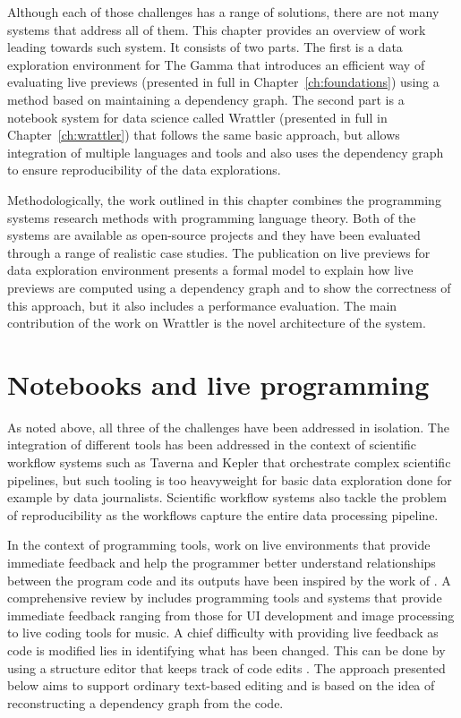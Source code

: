 \documentclass[fleqn,11pt]{report}
\theoremstyle{definition}
\begin{document}
Although each of those challenges has a range of solutions, there are not many systems that
address all of them. This chapter provides an overview of work leading towards such system.
It consists of two parts. The first is a data exploration environment for The Gamma that introduces
an efficient way of evaluating live previews (presented in full in Chapter~\ref{ch:foundations})
using a method based on maintaining a dependency graph. The second part is a notebook system for
data science called Wrattler (presented in full in Chapter~\ref{ch:wrattler}) that
follows the same basic approach, but allows integration of multiple languages and tools and also
uses the dependency graph to ensure reproducibility of the data explorations.

Methodologically, the work outlined in this chapter combines the programming systems research
methods with programming language theory. Both of the systems are available as open-source
projects and they have been evaluated through a range of realistic case studies. The publication
on live previews for data exploration environment presents a formal model to explain how
live previews are computed using a dependency graph and to show the correctness of this approach,
but it also includes a performance evaluation. The main contribution of the work on Wrattler
is the novel architecture of the system.

\section{Notebooks and live programming}

As noted above, all three of the challenges have been addressed in isolation. The integration of
different tools has been addressed in the context of scientific workflow systems such as
Taverna \citep{oinn-2004-taverna} and Kepler \citep{altintas-2004-kepler} that orchestrate
complex scientific pipelines, but such tooling is too heavyweight for basic data exploration
done for example by data journalists. Scientific workflow systems also tackle the problem
of reproducibility as the workflows capture the entire data processing pipeline.

In the context of programming tools, work on live environments that provide immediate feedback
and help the programmer better understand relationships between the program code and its outputs
have been inspired by the work of \cite{victor-2012-learnable,victor-2012-principle}. A
comprehensive review by \cite{rein-2019-review} includes programming tools and systems that
provide immediate feedback ranging from those for UI development and image processing to live
coding tools for music. A chief difficulty with providing live feedback as code is modified
lies in identifying what has been changed. This can be done by using a structure editor that
keeps track of code edits \citep{omar-2019-live}. The approach presented below aims to support
ordinary text-based editing and is based on the idea of reconstructing a dependency graph from
the code.
\end{document}
